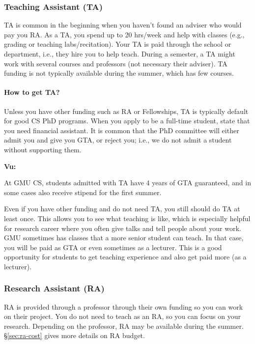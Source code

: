 \documentclass[11pt]{article}
\newenvironment{commentbox}[1][]{
\small
    \begin{mybox}
    {\small \textbf{#1}}
 }{
   \end{mybox}
}
\begin{document}
\subsubsection{Teaching Assistant (TA)}\label{sec:ta}

TA is common in the beginning when you haven't found an adviser who would pay you RA. As a TA, you spend up to 20 hrs/week and help with classes (e.g., grading or teaching labs/recitation). Your TA is paid through the school or department, i.e., they hire you to help teach.  During a semester, a TA might work with several courses and professors (not necessary their adviser).  TA funding is not typically available during the summer, which has few courses.

\paragraph{How to get TA?}  Unless you have other funding such as RA or Fellowships, TA is typically default for good CS PhD programs. When you apply to be a full-time student,  state that you need financial assistant. It is common that the PhD committee will either admit you and give you GTA, or reject you; i.e., we do not admit a student without supporting them.  

\begin{commentbox}[Vu:]
At GMU CS, students admitted with TA have  4 years of GTA guaranteed, and in some cases also receive  stipend for the first summer.
\end{commentbox}

Even if you have other funding and do not need TA, you still should do TA at least once.  This allows you to see what teaching is like, which is especially helpful for research career where you often give talks and tell people about your work. GMU sometimes has classes that a more senior student can teach.  In that case, you will be paid as GTA or even sometimes as a lecturer.  This is a good opportunity for students to get teaching experience and also get paid more (as a lecturer).

\subsubsection{Research Assistant (RA)}
RA is provided through a professor through their own funding so you can work on their project.  
You do not need to teach as an RA, so you can focus on your research. Depending on the professor, RA may be available during the summer. \S\ref{sec:ra-cost} gives more details on RA budget.
\end{document}

